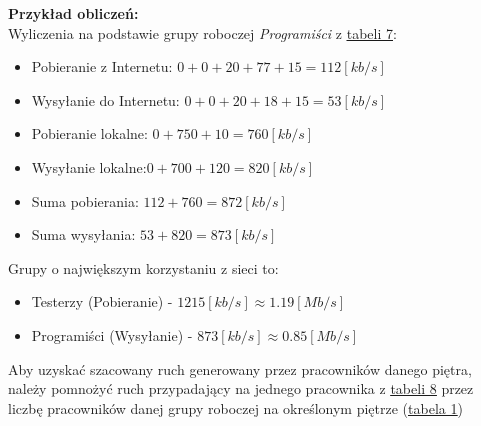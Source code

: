 \documentclass[a4paper,12pt]{extarticle}  %
\begin{document}
\textbf{Przykład obliczeń:}\\
Wyliczenia na podstawie grupy roboczej \emph{Programiści} z \underline{\hyperref[tab:apps]{tabeli 7}}:
\begin{itemize}
	\item Pobieranie z Internetu: $0+0+20+77+15=112[kb/s]$
	\item Wysyłanie do Internetu: $0+0+20+18+15=53[kb/s]$
	\item Pobieranie lokalne: $0+750+10=760[kb/s]$
	\item Wysyłanie lokalne:$0+700+120=820[kb/s]$
	\item Suma pobierania: $112+760=872[kb/s]$
	\item Suma wysyłania: $53+820=873[kb/s]$
\end{itemize}
Grupy o największym korzystaniu z sieci to:
\begin{itemize}
	\item Testerzy (Pobieranie) - $1215[kb/s] \approx 1.19[Mb/s]$
	\item Programiści (Wysyłanie) - $873[kb/s] \approx 0.85[Mb/s]$ %
\end{itemize}
Aby uzyskać szacowany ruch generowany przez pracowników danego piętra,
należy pomnożyć ruch przypadający na jednego pracownika z
\underline{\hyperref[tab:user_usage]{tabeli 8}} przez liczbę pracowników danej grupy roboczej na określonym piętrze (\underline{\hyperref[tab:groups]{tabela 1}})
\end{document}
